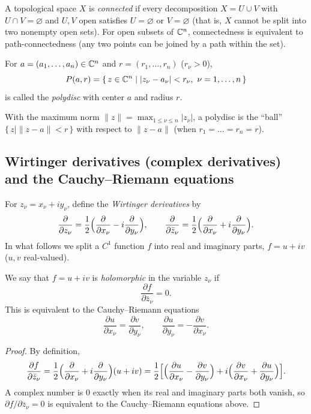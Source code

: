 \begin{note}
A topological space $X$ is \emph{connected} if every decomposition
$X = U \cup V$ with $U \cap V = \varnothing$ and $U, V$ open satisfies
$U = \varnothing$ or $V = \varnothing$ (that is, $X$ cannot be split into two
nonempty open sets). For open subsets of $\mathbb{C}^n$, connectedness is equivalent to
path-connectedness (any two points can be joined by a path within the set).
\end{note}

\begin{definition}[polydisc]
For $a = (a_1, \dots, a_n) \in \mathbb{C}^n$ and $r = (r_1, \dots, r_n)$ ($r_\nu > 0$),
\[
  P(a, r) = \{\, z \in \mathbb{C}^n \mid |z_\nu - a_\nu| < r_\nu,\ \nu = 1, \dots, n \,\}
\]
is called the \emph{polydisc} with center $a$ and radius $r$.
\end{definition}

\begin{note}
With the maximum norm $\|z\| = \max_{1 \le \nu \le n} |z_\nu|$, a polydisc is
the ``ball'' $\{\, z \mid \|z - a\| < r \,\}$ with respect to $\|z - a\|$ (when
$r_1 = \dots = r_n = r$).
\end{note}

\subsection*{Wirtinger derivatives (complex derivatives) and the Cauchy--Riemann equations}

For $z_\nu = x_\nu + i y_\nu$, define the \emph{Wirtinger derivatives} by
\[
  \frac{\partial}{\partial z_\nu}
    = \frac{1}{2}\Bigl( \frac{\partial}{\partial x_\nu} - i \frac{\partial}{\partial y_\nu} \Bigr),
  \qquad
  \frac{\partial}{\partial \bar z_\nu}
    = \frac{1}{2}\Bigl( \frac{\partial}{\partial x_\nu} + i \frac{\partial}{\partial y_\nu} \Bigr).
\]
In what follows we split a $C^1$ function $f$ into real and imaginary parts,
$f = u + i v$ ($u, v$ real-valued).

\begin{definition}
We say that $f = u + i v$ is \emph{holomorphic} in the variable $z_\nu$ if
\[
  \frac{\partial f}{\partial \bar z_\nu} = 0 .
\]
This is equivalent to the Cauchy--Riemann equations
\[
  \frac{\partial u}{\partial x_\nu} = \frac{\partial v}{\partial y_\nu}, \qquad
  \frac{\partial u}{\partial y_\nu} = -\frac{\partial v}{\partial x_\nu} .
\]
\end{definition}

\begin{proof}
By definition,
\[
  \frac{\partial f}{\partial \bar z_\nu}
  = \frac{1}{2}\Bigl( \frac{\partial}{\partial x_\nu} + i \frac{\partial}{\partial y_\nu} \Bigr)(u + i v)
  = \frac{1}{2}\Bigl[ \Bigl( \frac{\partial u}{\partial x_\nu} - \frac{\partial v}{\partial y_\nu} \Bigr)
      + i \Bigl( \frac{\partial v}{\partial x_\nu} + \frac{\partial u}{\partial y_\nu} \Bigr) \Bigr].
\]
A complex number is $0$ exactly when its real and imaginary parts both vanish,
so $\partial f / \partial \bar z_\nu = 0$ is equivalent to the Cauchy--Riemann
equations above.
\end{proof}

